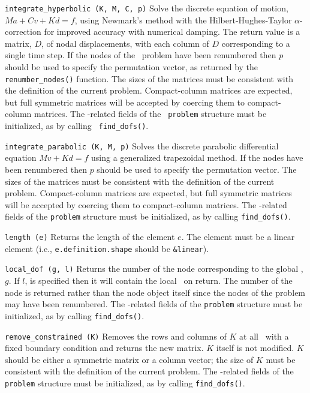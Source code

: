 \begin{dispitems}
\item[\tt integrate\_hyperbolic (K, M, C, p)]
Solve the discrete equation of motion, $Ma + Cv + Kd = f$, using
Newmark's method with the Hilbert-Hughes-Taylor $\alpha$-correction
for improved accuracy with numerical damping.  The return value is a
matrix, $D$, of nodal displacements, with each column of $D$
corresponding to a single time step.  If the nodes of the \felt\
problem have been renumbered then $p$ should be used to specify the
permutation vector, as returned by the {\tt renumber\_nodes()}
function.  The sizes of the matrices must be consistent with the
definition of the current problem.  Compact-column matrices are
expected, but full symmetric matrices will be accepted by coercing
them to compact-column matrices.  The \dof-related fields of the {\tt
problem} structure must be initialized, as by calling {\tt
find\_dofs()}.

\item[\tt integrate\_parabolic (K, M, p)]
Solves the discrete parabolic differential equation $Mv + Kd = f$
using a generalized trapezoidal method.  If the nodes have been
renumbered then $p$ should be used to specify the permutation vector.
The sizes of the matrices must be consistent with the definition of
the current problem.  Compact-column matrices are expected, but full
symmetric matrices will be accepted by coercing them to compact-column
matrices.  The \dof-related fields of the {\tt problem} structure must
be initialized, as by calling {\tt find\_dofs()}.

\item[\tt length (e)]
Returns the length of the element $e$.  The element must be a linear
element (i.e., {\tt e.definition.shape} should be {\tt \&linear}).

\item[\tt local\_dof (g, l)]
Returns the number of the node corresponding to the global \dof, $g$.
If $l$, is specified then it will contain the local \dof\ on return.
The number of the node is returned rather than the node object itself
since the nodes of the problem may have been renumbered.  The
\dof-related fields of the {\tt problem} structure must be
initialized, as by calling {\tt find\_dofs()}.

\item[\tt remove\_constrained (K)]
Removes the rows and columns of $K$ at all \dofs\ with a fixed
boundary condition and returns the new matrix.  $K$ itself is not
modified.  $K$ should be either a symmetric matrix or a column vector;
the size of $K$ must be consistent with the definition of the current
problem.  The \dof-related fields of the {\tt problem} structure must
be initialized, as by calling {\tt find\_dofs()}.


\end{dispitems}
